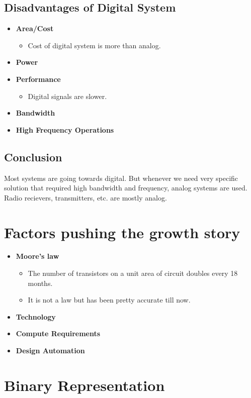 \documentclass[oneside]{book}
\begin{document}
\subsection{Disadvantages of Digital System}
\begin{itemize}
	\item \textbf{Area/Cost}
	      \begin{itemize}
		      \item Cost of digital system is more than analog.
	      \end{itemize}
	\item \textbf{Power}
	\item \textbf{Performance}
	      \begin{itemize}
		      \item Digital signals are slower.
	      \end{itemize}
	\item \textbf{Bandwidth}
	\item \textbf{High Frequency Operations}
\end{itemize}

\subsection{Conclusion}
Most systems are going towards digital. But whenever we need very specific solution that required high bandwidth and frequency, analog systems are used. Radio recievers, transmitters, etc. are mostly analog.

\section{Factors pushing the growth story}
\begin{itemize}
	\item \textbf{Moore's law}
	      \begin{itemize}
		      \item The number of transistors on a unit area of circuit doubles every 18 months.
		      \item It is not a law but has been pretty accurate till now.
	      \end{itemize}
	\item \textbf{Technology}
	\item \textbf{Compute Requirements}
	\item \textbf{Design Automation}
\end{itemize}

\section{Binary Representation}
\end{document}
